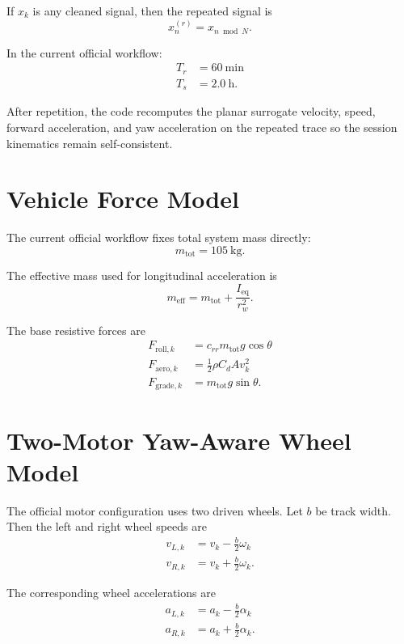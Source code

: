 \documentclass[11pt]{article}
\begin{document}
If \(x_k\) is any cleaned signal, then the repeated signal is
\begin{equation}
x^{(r)}_n = x_{n \bmod N}.
\end{equation}

In the current official workflow:
\begin{align}
T_r &= 60 \ \mathrm{min} \\
T_s &= 2.0 \ \mathrm{h}.
\end{align}

After repetition, the code recomputes the planar surrogate velocity, speed, forward acceleration, and yaw acceleration on the repeated trace so the session kinematics remain self-consistent.

\section{Vehicle Force Model}
The current official workflow fixes total system mass directly:
\begin{equation}
m_{\mathrm{tot}} = 105 \ \mathrm{kg}.
\end{equation}

The effective mass used for longitudinal acceleration is
\begin{equation}
m_{\mathrm{eff}} = m_{\mathrm{tot}} + \frac{I_{\mathrm{eq}}}{r_w^2}.
\end{equation}

The base resistive forces are
\begin{align}
F_{\mathrm{roll},k} &= c_{rr} m_{\mathrm{tot}} g \cos\theta \\
F_{\mathrm{aero},k} &= \frac{1}{2}\rho C_dA v_k^2 \\
F_{\mathrm{grade},k} &= m_{\mathrm{tot}} g \sin\theta.
\end{align}

\section{Two-Motor Yaw-Aware Wheel Model}
The official motor configuration uses two driven wheels. Let \(b\) be track width. Then the left and right wheel speeds are
\begin{align}
v_{L,k} &= v_k - \frac{b}{2}\omega_k \\
v_{R,k} &= v_k + \frac{b}{2}\omega_k.
\end{align}

The corresponding wheel accelerations are
\begin{align}
a_{L,k} &= a_k - \frac{b}{2}\alpha_k \\
a_{R,k} &= a_k + \frac{b}{2}\alpha_k.
\end{align}
\end{document}
